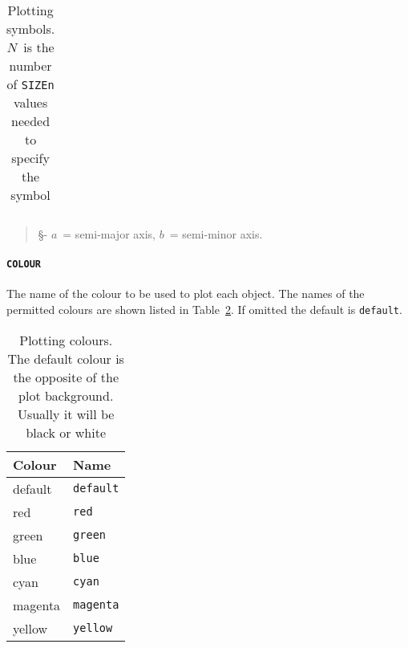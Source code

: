 \documentclass[twoside,11pt]{article}
\renewcommand{\_}{\texttt{\symbol{95}}}
\begin{document}
\begin{table}[htbp]
\begin{center}
\begin{tabular}{lllc}
\end{tabular}
\end{center}

\begin{quote}
\S - $a$\, = semi-major axis, $b$\, = semi-minor axis.
\end{quote}

\begin{quote}
\caption[Plotting symbols]{Plotting symbols.  $N$\, is the number of
{\tt SIZEn} values needed to specify the symbol \label{GRT_SYMBOL} }
\end{quote}

\end{table}

\paragraph{{\tt COLOUR}} The name of the colour to be used to plot
each object.  The names of the permitted colours are shown listed in
Table~\ref{GRT_COLOUR}.  If omitted the default is {\tt default}.

\begin{table}[htbp]

\begin{center}
\begin{tabular}{ll}
Colour   & Name \\ \hline
default  & {\tt default}  \\
red      & {\tt red}      \\
green    & {\tt green}    \\
blue     & {\tt blue}     \\
cyan     & {\tt cyan}     \\
magenta  & {\tt magenta}  \\
yellow   & {\tt yellow}   \\
\end{tabular}
\end{center}

\begin{quote}
\caption[Plotting colours]{Plotting colours.  The default colour is the
opposite of the plot background.  Usually it will be black or white
\label{GRT_COLOUR} }
\end{quote}

\end{table}
\end{document}

